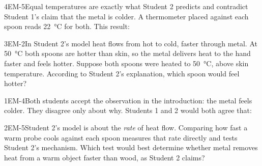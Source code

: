 \documentclass[11pt]{article}
\begin{document}
\begin{q}{4}{EM-5}{Equal temperatures are exactly what Student 2 predicts and contradict Student 1's claim that the metal is colder.}
A thermometer placed against each spoon reads \SI{22}{\celsius} for both. This result:
\end{q}

\begin{q}{3}{EM-2}{In Student 2's model heat flows from hot to cold, faster through metal. At \SI{50}{\celsius} both spoons are hotter than skin, so the metal delivers heat to the hand faster and feels hotter.}
Suppose both spoons were heated to \SI{50}{\celsius}, above skin temperature. According to Student 2's explanation, which spoon would feel hotter?
\end{q}

\begin{q}{1}{EM-4}{Both students accept the observation in the introduction: the metal feels colder. They disagree only about why.}
Students 1 and 2 would both agree that:
\end{q}

\begin{q}{2}{EM-5}{Student 2's model is about the \emph{rate} of heat flow. Comparing how fast a warm probe cools against each spoon measures that rate directly and tests Student 2's mechanism.}
Which test would best determine whether metal removes heat from a warm object faster than wood, as Student 2 claims?
\end{q}

\vspace{2ex}
\end{document}
